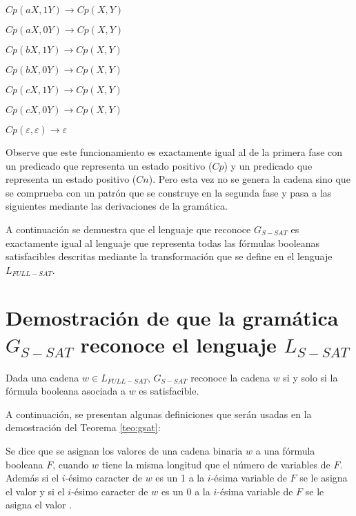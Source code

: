\begin{itemize}
\begin{enumerate}[start=23]
\begin{multicols}{2}
                  \item $Cp(aX,1Y) \to Cp(X,Y)$
                  \item $Cp(aX,0Y) \to Cp(X,Y)$
                  \item $Cp(bX,1Y) \to Cp(X,Y)$
                  \item $Cp(bX,0Y) \to Cp(X,Y)$
                  \item $Cp(cX,1Y) \to Cp(X,Y)$
                  \item $Cp(cX,0Y) \to Cp(X,Y)$
                  \item $Cp(\varepsilon,\varepsilon)\to \varepsilon$
              \end{multicols}
          \end{enumerate}
          
          Observe que este funcionamiento es exactamente igual al de la primera fase con un predicado que representa un estado positivo ($Cp$) y un predicado que representa un estado positivo ($Cn$). Pero esta vez no se genera la cadena sino que se comprueba con un patrón que se construye en la segunda fase y pasa a las siguientes mediante las derivaciones de la gramática.
          
\end{itemize}

A continuación se demuestra que el lenguaje que reconoce $G_{S-SAT}$ es exactamente igual al lenguaje que
representa todas las fórmulas booleanas satisfacibles descritas mediante la transformación que se define
en el lenguaje $L_{FULL-SAT}$.

\section{Demostración de que la gramática $G_{S-SAT}$ reconoce el lenguaje $L_{S-SAT}$}

\begin{theorem}
    \label{teo:gsat}
    Dada una cadena $w\in L_{FULL-SAT}$, $G_{S-SAT}$ reconoce la cadena $w$ si y solo si la fórmula booleana asociada a
    $w$ es satisfacible. 
\end{theorem}

A continuación, se presentan algunas definiciones que serán usadas en la demostración del Teorema \ref{teo:gsat}:

\begin{definition}
    Se dice que se asignan los valores de una cadena binaria $w$ a una fórmula booleana $F$, cuando $w$ tiene la misma longitud
    que el número de variables de $F$. Además si el $i$-ésimo caracter de $w$ es un 1 a la $i$-ésima variable de $F$ se le asigna
    el valor \true{} y si el $i$-ésimo caracter de $w$ es un 0 a la $i$-ésima variable de $F$ se le asigna
    el valor \false{}.
\end{definition}

